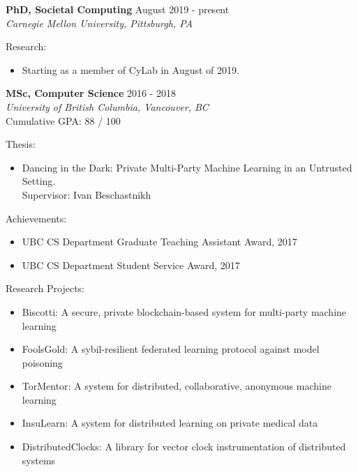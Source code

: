 \documentclass[10pt]{res} %
\begin{document}
\vspace{0.2in} %


\textbf {PhD, Societal Computing} \hfill August 2019 - present \\ 
{\sl Carnegie Mellon University, Pittsburgh, PA} 

Research:
\begin{itemize}   
    \item Starting as a member of CyLab in August of 2019.    
\end{itemize}


\textbf {MSc, Computer Science} \hfill 2016 - 2018 \\ 
{\sl University of British Columbia, Vancouver, BC} \\
Cumulative GPA: 88 / 100

Thesis:
\begin{itemize} 
    \item Dancing in the Dark: Private Multi-Party Machine Learning in an Untrusted Setting. \\
    Supervisor: Ivan Beschastnikh
\end{itemize}

Achievements:
\begin{itemize} 
    \item UBC CS Department Graduate Teaching Assistant Award, 2017
    \item UBC CS Department Student Service Award, 2017
\end{itemize}

Research Projects:
\begin{itemize}   
    \item Biscotti: A secure, private blockchain-based system for multi-party machine learning
    \item FoolsGold: A sybil-resilient federated learning protocol against 
    model poisoning 
    \item TorMentor: A system for distributed, collaborative, anonymous
    machine learning
    \item InsuLearn: A system for distributed learning on private
    medical data
    \item DistributedClocks: A library for vector clock instrumentation
    of distributed systems
\end{itemize}
\end{document}
